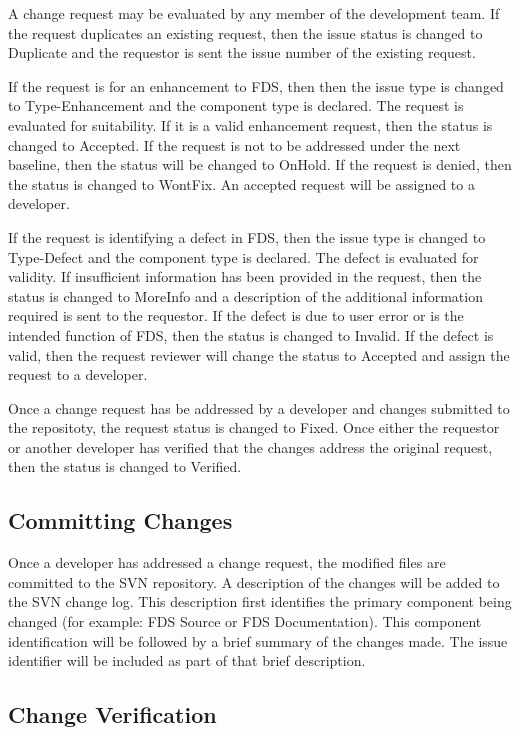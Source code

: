 \documentclass[11pt]{book}
\begin{document}
A change request may be evaluated by any member of the development team.
If the request duplicates an existing request, then the issue status is changed to {\ct Duplicate} and the
requestor is sent the issue number of the existing request.

If the request is for an enhancement to FDS, then then the issue type is changed to {\ct Type-Enhancement} and the
component type is declared. The request is evaluated for suitability.  If it is a valid enhancement
request, then the status is changed to {\ct Accepted}.  If the request is not to
be addressed under the next baseline, then the status will be changed to {\ct OnHold}.  If the request is denied, then
the status is changed to {\ct WontFix}.  An accepted request will be assigned to a developer.

If the request is identifying a defect in FDS, then the issue type is changed to {\ct Type-Defect} and the
component type is declared.  The defect is evaluated for validity.  If insufficient information has
been provided in the request, then the status is changed to {\ct MoreInfo} and a description of the additional
information required is sent to the requestor.  If the defect is due to user error or is the intended function of FDS,
then the status is changed to {\ct Invalid}.  If the defect is valid, then the request reviewer will change the
status to {\ct Accepted} and assign the request to a developer.

Once a change request has be addressed by a developer and changes submitted to the repositoty, the request status
is changed to {\ct Fixed}.  Once either the requestor or another developer has verified that the changes address
the original request, then the status is changed to {\ct Verified}.


\subsection{Committing Changes}

Once a developer has addressed a change request, the modified files are committed to the SVN repository.  A description
of the changes will be added to the SVN change log.  This description first identifies the primary component being
changed (for example: FDS Source or FDS Documentation).  This component identification will be followed by a brief
summary of the changes made.  The issue identifier will be included as part of that brief description.

\subsection{Change Verification}
\end{document}
